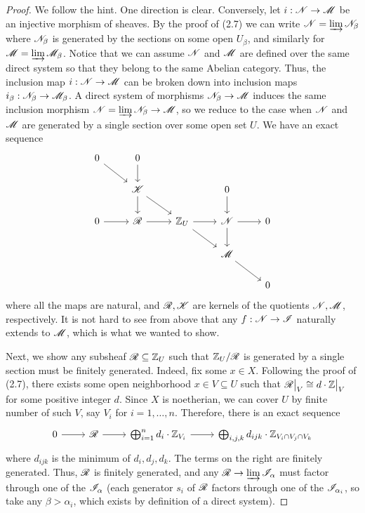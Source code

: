 \documentclass{article}
\begin{document}
\begin{enumerate} [label=\textbf{\arabic*.}, leftmargin=0em]
\begin{proof} 
We follow the hint. One direction is clear. Conversely, let $i : \mathscr{N} \to \mathscr{M}$ be an injective morphism of sheaves. By the proof of (2.7) we can write $\mathscr{N} = \varinjlim \mathscr{N}_\beta$ where $\mathscr{N}_\beta$ is generated by the sections on some open $U_\beta$, and similarly for $\mathscr{M} = \varinjlim \mathscr{M}_\beta$. Notice that we can assume $\mathscr{N}$ and $\mathscr{M}$ are defined over the same direct system so that they belong to the same Abelian category. Thus, the inclusion map $i : \mathscr{N} \to \mathscr{M}$ can be broken down into inclusion maps $i_\beta : \mathscr{N}_\beta \to \mathscr{M}_\beta$. A direct system of morphisms $\mathscr{N}_\beta \to \mathscr{M}$ induces the same inclusion morphism $\mathscr{N} = \varinjlim \mathscr{N}_\beta \to \mathscr{M}$, so we reduce to the case when $\mathscr{N}$ and $\mathscr{M}$ are generated by a single section over some open set $U$. We have an exact sequence
\[ \begin{tikzcd}
    0 \arrow[rd] & 0 \arrow[d]              &                           &                         &   \\
                 & \fK \arrow[rd] \arrow[d] &                           & 0 \arrow[d]             &   \\
    0 \arrow[r]  & \fR \arrow[r]            & \Z_U \arrow[r] \arrow[rd] & \fN \arrow[r] \arrow[d] & 0 \\
                 &                          &                           & \fM \arrow[rd]          &   \\
                 &                          &                           &                         & 0
    \end{tikzcd} \]
where all the maps are natural, and $\mathscr{R}, \mathscr{K}$ are kernels of the quotients $\mathscr{N}, \mathscr{M}$, respectively. It is not hard to see from above that any $f : \mathscr{N} \to \mathscr{I}$ naturally extends to $\mathscr{M}$, which is what we wanted to show.

Next, we show any subsheaf $\mathscr{R} \subseteq \mathbb{Z}_U$ such that $\mathbb{Z}_U / \mathscr{R}$ is generated by a single section must be finitely generated. Indeed, fix some $x \in X$. Following the proof of (2.7), there exists some open neighborhood $x \in V \subseteq U$ such that $\restr{\fR}{V} \cong d \cdot \restr{\Z}{V}$ for some positive integer $d$. Since $X$ is noetherian, we can cover $U$ by finite number of such $V$, say $V_i$ for $i = 1, \dots, n$. Therefore, there is an exact sequence
\[ \begin{tikzcd}
    0 \arrow[r] & \fR \arrow[r] & \bigoplus_{i = 1}^n d_i \cdot \Z_{V_i} \arrow[r] & {\bigoplus_{i,j,k} d_{ijk} \cdot \Z_{V_i \cap V_j \cap V_k}}
    \end{tikzcd} \]
where $d_{ijk}$ is the minimum of $d_i, d_j, d_k$. The terms on the right are finitely generated. Thus, $\mathscr{R}$ is finitely generated, and any $\mathscr{R} \to \varinjlim \mathscr{I}_\alpha$ must factor through one of the $\mathscr{I}_\alpha$ (each generator $s_i$ of $\mathscr{R}$ factors through one of the $\mathscr{I}_{\alpha_i}$, so take any $\beta > \alpha_i$, which exists by definition of a direct system).
\end{proof}


\end{enumerate}
\end{document}
